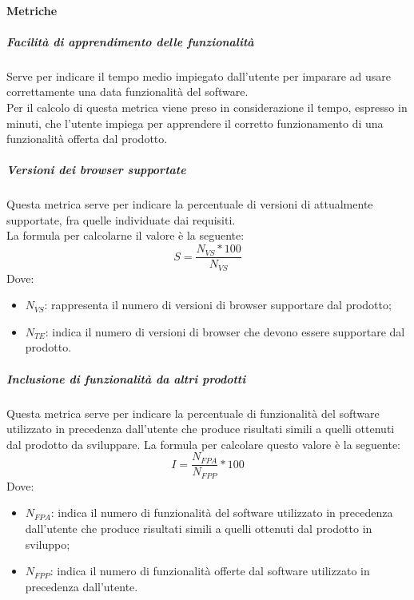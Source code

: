 \documentclass[../NormeDiProgetto_v3.0.0.tex]{subfiles}
\begin{document}
		\paragraph{Metriche}
            
			\subparagraph{Facilità di apprendimento delle funzionalità}
				Serve per indicare il tempo medio impiegato dall'utente per imparare ad usare correttamente una data funzionalità del software.\\
				Per il calcolo di questa metrica viene preso in considerazione il tempo, espresso in minuti, che l'utente impiega per apprendere il corretto funzionamento di una funzionalità offerta dal prodotto.

			\subparagraph{Versioni dei browser supportate}
				Questa metrica serve per indicare la percentuale di versioni di  attualmente supportate, fra quelle individuate dai requisiti. \\La formula per calcolarne il valore è la seguente:
					\begin{equation*}
						S = \frac{N_{VS} * 100}{N_{VS}}
					\end{equation*}
					Dove:
					\begin{itemize}
						\item \textbf{$N_{VS}$}: rappresenta il numero di versioni di browser supportare dal prodotto;
						\item \textbf{$N_{TE}$}: indica il numero di versioni di browser che devono essere supportare dal prodotto.
					\end{itemize}
					
			\subparagraph{Inclusione di funzionalità da altri prodotti}
				Questa metrica serve per indicare la percentuale di funzionalità del software utilizzato in precedenza dall'utente che produce risultati simili a quelli ottenuti dal prodotto da sviluppare. La formula per calcolare questo valore è la seguente:
					\begin{equation*}
						I = \frac{N_{FPA}}{N_{FPP}} * 100
					\end{equation*}
					Dove:
					\begin{itemize}
						\item \textbf{$N_{FPA}$}: indica il numero di funzionalità del software utilizzato in precedenza dall'utente che produce risultati simili a quelli ottenuti dal prodotto in sviluppo;
						\item \textbf{$N_{FPP}$}: indica il numero di funzionalità offerte dal software utilizzato in precedenza dall'utente.
					\end{itemize}
		
\end{document}
